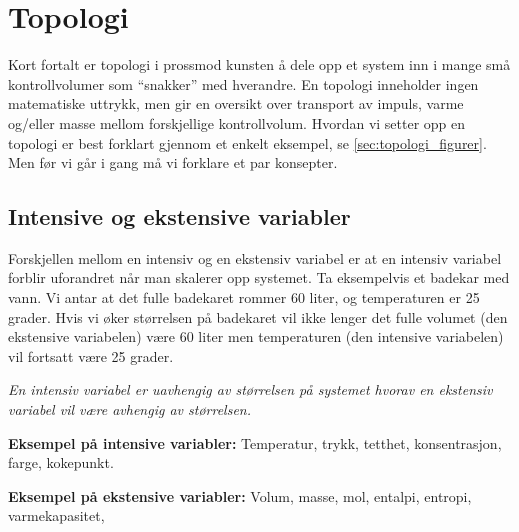 \section{Topologi}\label{sec:topologi}
Kort fortalt er topologi i prossmod kunsten å dele opp et system inn i mange små kontrollvolumer som ``snakker'' med hverandre. En topologi inneholder ingen matematiske uttrykk, men gir en oversikt over transport av impuls, varme og/eller masse mellom forskjellige kontrollvolum. Hvordan vi setter opp en topologi er best forklart gjennom et enkelt eksempel, se \cref{sec:topologi_figurer}. Men før vi går i gang må vi forklare et par konsepter.

\subsection{Intensive og ekstensive variabler}
\label{sec:ekstensive_intensive}
Forskjellen mellom en intensiv og en ekstensiv variabel er at en intensiv variabel forblir uforandret når man skalerer opp systemet. Ta eksempelvis et badekar med vann. Vi antar at det fulle badekaret rommer 60 liter, og temperaturen er 25 grader. Hvis vi øker størrelsen på badekaret vil ikke lenger det fulle volumet (den ekstensive variabelen) være 60 liter men temperaturen (den intensive variabelen) vil fortsatt være 25 grader. 

\begin{center}
    \textit{En intensiv variabel er uavhengig av størrelsen på systemet hvorav en ekstensiv variabel vil være avhengig av størrelsen. }
\end{center}

\textbf{Eksempel på intensive variabler:} Temperatur, trykk, tetthet, konsentrasjon, farge, kokepunkt.

\textbf{Eksempel på ekstensive variabler:} Volum, masse, mol, entalpi, entropi, varmekapasitet, 


\clearpage
